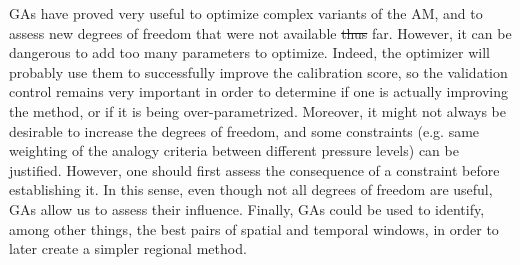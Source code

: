 \documentclass[review]{elsarticle}
\providecommand{\DIFaddtex}[1]{{\protect\color{blue}\uwave{#1}}} %
\providecommand{\DIFdeltex}[1]{{\protect\color{red}\sout{#1}}}                      %
\providecommand{\DIFaddbegin}{} %
\providecommand{\DIFaddend}{} %
\providecommand{\DIFdelbegin}{} %
\providecommand{\DIFdelend}{} %
\providecommand{\DIFadd}[1]{\texorpdfstring{\DIFaddtex{#1}}{#1}} %
\providecommand{\DIFdel}[1]{\texorpdfstring{\DIFdeltex{#1}}{}} %
\begin{document}
GAs have proved very useful to optimize complex variants of the AM, and to assess new degrees of freedom that were not available \DIFdelbegin \DIFdel{thus }\DIFdelend \DIFaddbegin \DIFadd{so }\DIFaddend far. However, it can be dangerous to add too many parameters to optimize. Indeed, the optimizer will probably use them to successfully improve the calibration score, so the validation control remains very important in order to determine if one is actually improving the method, or if it is being over-parametrized. Moreover, it might not always be desirable to increase the degrees of freedom, and some constraints (e.g. same weighting of the analogy criteria between different pressure levels) can be justified. However, one should first assess the consequence of a constraint before establishing it. In this sense, even though not all degrees of freedom are useful, GAs allow us to assess their influence. Finally, GAs could be used to identify, among other things, the best pairs of spatial and temporal windows, in order to later create a simpler regional method.
\end{document}
